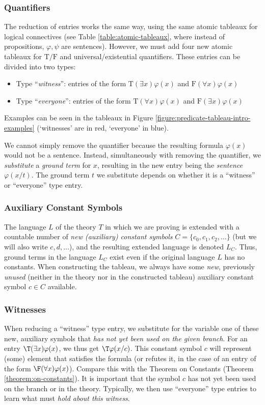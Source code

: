 \subsubsection{Quantifiers}
The reduction of entries works the same way, using the same atomic tableaux for logical connectives (see Table \ref{table:atomic-tableaux}, where instead of propositions, $\varphi,\psi$ are sentences). However, we must add four new atomic tableaux for $\mathrm T/\mathrm F$ and universal/existential quantifiers. These entries can be divided into two types:
\begin{itemize}
    \item Type ``\emph{witness}'': entries of the form $\mathrm{T}(\exists x)\varphi(x)$ and $\mathrm{F}(\forall x)\varphi(x)$
    \item Type ``\emph{everyone}'': entries of the form $\mathrm{T}(\forall x)\varphi(x)$ and $\mathrm{F}(\exists x)\varphi(x)$    
\end{itemize}
Examples can be seen in the tableaux in Figure \ref{figure:predicate-tableau-intro-examples} (`witnesses' are in red, `everyone' in blue).

We cannot simply remove the quantifier because the resulting formula $\varphi(x)$ would not be a sentence. Instead, simultaneously with removing the quantifier, we \emph{substitute} a \emph{ground term} for $x$, resulting in the new entry being the \emph{sentence} $\varphi(x/t)$. The ground term $t$ we substitute depends on whether it is a ``witness'' or ``everyone'' type entry.

\subsubsection{Auxiliary Constant Symbols}
The language $L$ of the theory $T$ in which we are proving is extended with a countable number of \emph{new (auxiliary) constant symbols} $C=\{c_0,c_1,c_2,\dots\}$ (but we will also write $c,d,\dots$), and the resulting extended language is denoted $L_C$. Thus, ground terms in the language $L_C$ exist even if the original language $L$ has no constants. When constructing the tableau, we always have some \emph{new}, previously \emph{unused} (neither in the theory nor in the constructed tableau) auxiliary constant symbol $c\in C$ available.

\subsubsection{Witnesses}
When reducing a ``witness'' type entry, we substitute for the variable one of these new, auxiliary symbols that \emph{has not yet been used on the given branch}. For an entry $\T(\exists x)\varphi(x)$, we thus get $\T\varphi(x/c)$. This constant symbol $c$ will represent (some) element that satisfies the formula (or refutes it, in the case of an entry of the form $\F(\forall x)\varphi(x)$). Compare this with the Theorem on Constants (Theorem \ref{theorem:on-constants}). It is important that the symbol $c$ has not yet been used on the branch or in the theory. Typically, we then use ``everyone'' type entries to learn what must \emph{hold about this witness}.

